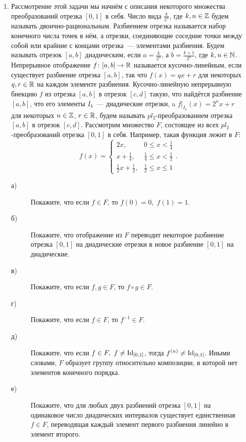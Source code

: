 \begin{enumerate}
\item Рассмотрение этой задачи мы начнём с описания некоторого множества преобразований отрезка $[0,1]$ в себя. Число вида $\frac{k}{2^n}$, где $k,n\in\mathbb{Z}$ будем называть двоично-рациональным. Разбиением отрезка называется набор конечного числа точек в нём, а отрезки, соединяющие соседние точки между собой или крайние с концами отрезка~— элементами разбиения. Будем называть отрезок $[a,b]$ диадическим, если $a=\frac{k}{2^n}$, а $b=\frac{k+1}{2^{n}}$, где $k, n\in\mathbb{N}$. Непрерывное отображение $f\colon [a,b]\to \mathbb{R}$  называется кусочно-линейным, если существует разбиение отрезка $[a,b]$, так что $f(x)=qx+r$ для некоторых $q,r\in\mathbb{R}$ на каждом элементе разбиения. Кусочно-линейную непрерывную биекцию $f$ из отрезка $[a,b]$ в отрезок $[c,d]$ такую, что найдётся разбиение $[a,b]$, что его элементы $I_k$~— диадические отрезки, a $f|_{I_k}(x)=2^nx+r$ для некоторых $n\in\mathbb{Z}$, $r\in \mathbb{R}$, будем называть $pl_2$-преобразованием отрезка $[a,b]$ в отрезок $[c,d]$. Рассмотрим множество $F$, состоящее из всех $pl_2$-преобразований отрезка $[0,1]$ в себя. Например, такая функция лежит в $F$:
$$ f(x)=\begin{cases}
2x,& 0\leq x<\frac{1}{4}\\
x+\frac{1}{4},& \frac{1}{4}\leq x<\frac{1}{2}\\
\frac{1}{2}x +\frac{1}{2},& \frac{1}{2}\leq x \leq 1
\end{cases}.
$$
\begin{description}
\item[а)] Покажите, что если $f\in F$, то $f(0)=0,\,\, f(1)=1$.
\item[б)] Покажите, что отображение из $F$ переводит некоторое разбиение отрезка $[0,1]$ на диадические отрезки в новое разбиение $[0,1]$ на диадические.
\item[в)] Покажите, что если $f,g\in F$, то $f\circ g\in F$.
\item[г)] Покажите, что если $f\in F$, то $f^{-1}\in F$.
\item[д)] Покажите, что если $f\in F, \,\, f\neq \operatorname{Id}_{[0,1]}$, тогда $f^{(n)}\neq \operatorname{Id}_{[0,1]}$. Иными словами, $F$ образует группу относительно композиции, в которой нет элементов конечного порядка.
\item[е)] Покажите, что для любых двух разбиений отрезка $[0,1]$ на одинаковое число диадических интервалов существует единственная $f\in F$, переводящая каждый элемент первого разбиения линейно в элемент второго.

\end{description}
\end{enumerate}
